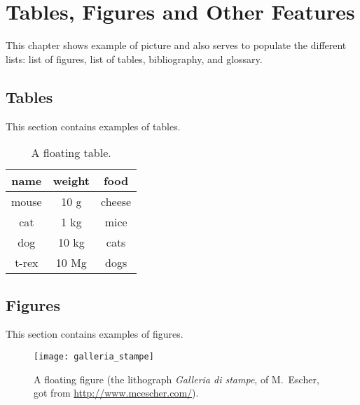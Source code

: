 \chapter{Tables, Figures and Other Features}
This chapter shows example of picture and also serves to populate the different lists: list of figures, list of tables, bibliography, and glossary.

\section{Tables}
This section contains examples of tables.

\begin{table}[H]
\centering
\begin{tabular}{ccc}
\toprule
name & weight & food \\ 
\midrule
mouse	& 10 g	& cheese \\
cat	& 1 kg	& mice \\
dog	& 10 kg	& cats \\
t-rex	& 10 Mg	& dogs \\
\bottomrule 
\end{tabular}
\caption[A floating table]{A floating table.}
\label{tab:esempio}
\end{table}

\section{Figures}
This section contains examples of figures.

\begin{figure}[H] 
\centering 
\texttt{[image: galleria\_stampe]} 
\caption[A floating figure]{A floating figure (the lithograph \emph{Galleria di stampe}, of M.~Escher, got from \url{http://www.mcescher.com/}).}
\label{fig:galleria} 
\end{figure}

